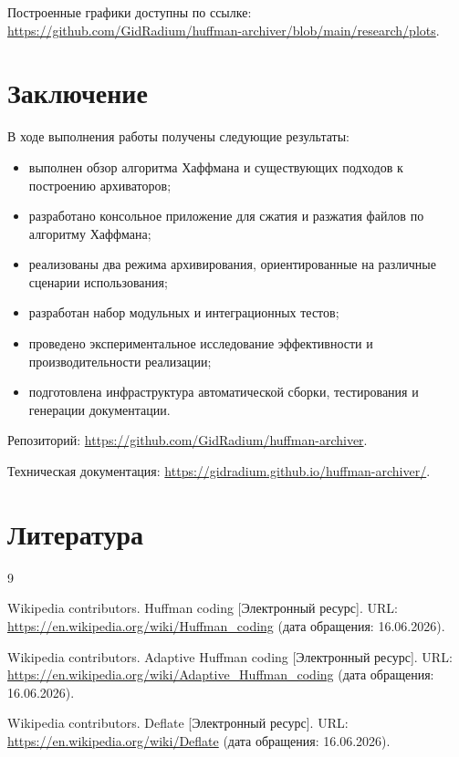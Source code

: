 \documentclass[a4paper]{article}
\begin{document}
Построенные графики доступны по ссылке:
\url{https://github.com/GidRadium/huffman-archiver/blob/main/research/plots}.

\section{Заключение}

В ходе выполнения работы получены следующие результаты:

\begin{itemize}
    \item выполнен обзор алгоритма Хаффмана и существующих подходов к построению архиваторов;
    \item разработано консольное приложение для сжатия и разжатия файлов по алгоритму Хаффмана;
    \item реализованы два режима архивирования, ориентированные на различные сценарии использования;
    \item разработан набор модульных и интеграционных тестов;
    \item проведено экспериментальное исследование эффективности и производительности реализации;
    \item подготовлена инфраструктура автоматической сборки, тестирования и генерации документации.
\end{itemize}

Репозиторий:
\url{https://github.com/GidRadium/huffman-archiver}.

Техническая документация:
\url{https://gidradium.github.io/huffman-archiver/}.

\section{Литература}

\begin{thebibliography}{9}

Wikipedia contributors.
Huffman coding [Электронный ресурс].
URL: \url{https://en.wikipedia.org/wiki/Huffman_coding}
(дата обращения: 16.06.2026).

Wikipedia contributors.
Adaptive Huffman coding [Электронный ресурс].
URL: \url{https://en.wikipedia.org/wiki/Adaptive_Huffman_coding}
(дата обращения: 16.06.2026).

Wikipedia contributors.
Deflate [Электронный ресурс].
URL: \url{https://en.wikipedia.org/wiki/Deflate}
(дата обращения: 16.06.2026).

\end{thebibliography}
\end{document}
